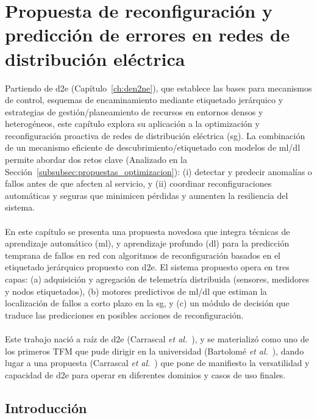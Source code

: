 \chapter{Propuesta de reconfiguración y predicción de errores en redes de distribución eléctrica}
\label{ch:fault_sg}

Partiendo de \gls{d2e} (Capítulo~\ref{ch:den2ne}), que establece las bases para mecanismos de control, esquemas de encaminamiento mediante etiquetado jerárquico y estrategias de gestión/planeamiento de recursos en entornos densos y heterogéneos, este capítulo explora su aplicación a la optimización y reconfiguración proactiva de redes de distribución eléctrica (\gls{sg}). La combinación de un mecanismo eficiente de descubrimiento/etiquetado con modelos de \gls{ml}/\gls{dl} permite abordar dos retos clave (Analizado en la Sección~\ref{subsubsec:propuestas_optimizacion}): (i) detectar y predecir anomalías o fallos antes de que afecten al servicio, y (ii) coordinar reconfiguraciones automáticas y seguras que minimicen pérdidas y aumenten la resiliencia del sistema.\\
\\
En este capítulo se presenta una propuesta novedosa que integra técnicas de aprendizaje automático (\gls{ml}), y aprendizaje profundo (\gls{dl}) para la predicción temprana de fallos en red con algoritmos de reconfiguración basados en el etiquetado jerárquico propuesto con \gls{d2e}. El sistema propuesto opera en tres capas: (a) adquisición y agregación de telemetría distribuida (sensores, medidores y nodos etiquetados), (b) motores predictivos de \gls{ml}/\gls{dl} que estiman la localización de fallos a corto plazo en la \gls{sg}, y (c) un módulo de decisión que traduce las predicciones en posibles acciones de reconfiguración.\\
\\
Este trabajo nació a raíz de \gls{d2e} (Carrascal \textit{et al.}~\cite{carrascal2024topology}), y se materializó como uno de los primeros TFM que pude dirigir en la universidad (Bartolomé \textit{et al.}~\cite{bartolome2024_smartgrids}), dando lugar a una propuesta (Carrascal \textit{et al.}~\cite{carrascal2024fault}) que pone de manifiesto la versatilidad y capacidad de \gls{d2e} para operar en diferentes dominios y casos de uso finales.

\section{Introducción}

